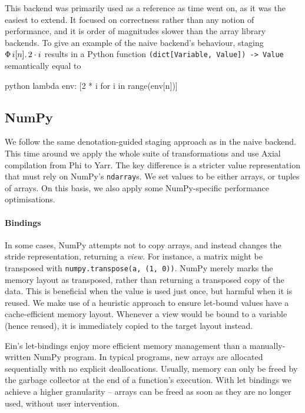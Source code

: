 This backend was primarily used as a reference as time went on, as it was the easiest to extend. It focused on correctness rather than any notion of performance, and it is order of magnitudes slower than the array library backends. To give an example of the naive backend's behaviour, staging $\Phi\, {i}[{n}] \ldotp {2 \cdot i}$ results in a Python function \texttt{(dict[Variable, Value]) -> Value} semantically equal to
\begin{center}
\begin{cminted}{python}
lambda env: [2 * i for i in range(env[n])]
\end{cminted}    
\end{center}

\subsection{NumPy}

We follow the same denotation-guided staging approach as in the naive backend. This time around we apply the whole suite of transformations and use Axial compilation from Phi to Yarr. The key difference is a stricter value representation that must rely on NumPy's \texttt{ndarray}s. We set values to be either arrays, or tuples of arrays. On this basis, we also apply some NumPy-specific performance optimisations.

\paragraph{Bindings} In some cases, NumPy attempts not to copy arrays, and instead changes the stride representation, returning a \textit{view}. For instance, a matrix might be transposed with \texttt{numpy.transpose(a, (1, 0))}. NumPy merely marks the memory layout as transposed, rather than returning a transposed copy of the data. This is beneficial when the value is used just once, but harmful when it is reused. We make use of a heuristic approach to ensure let-bound values have a cache-efficient memory layout. Whenever a view would be bound to a variable (hence reused), it is immediately copied to the target layout instead. 

Ein's let-bindings enjoy more efficient memory management than a manually-written NumPy program. In typical programs, new arrays are allocated sequentially with no explicit deallocations. Usually, memory can only be freed by the garbage collector at the end of a function's execution. With let bindings we achieve a higher granularity -- arrays can be freed as soon as they are no longer used, without user intervention.

